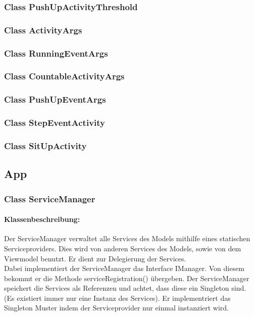 \documentclass[a4paper,12pt]{article}
\begin{document}
	\subsubsection{Class PushUpActivityThreshold}
	
	\subsubsection{Class ActivityArgs}
	\subsubsection{Class RunningEventArgs}
	
	\subsubsection{Class CountableActivityArgs}
	\subsubsection{Class PushUpEventArgs}
	\subsubsection{Class StepEventActivity}
	\subsubsection{Class SitUpActivity}
	

\subsection{App}
\subsubsection{Class ServiceManager}
	\paragraph{Klassenbeschreibung:}
	Der ServiceManager verwaltet alle Services des Models mithilfe eines statischen Serviceproviders. Dies wird von anderen Services des Models, sowie von dem Viewmodel benutzt. Er dient zur Delegierung der Services.\\ 
	Dabei implementiert der ServiceManager das Interface IManager.
	Von diesem bekommt er die Methode serviceRegistration() übergeben.
	Der ServiceManager speichert die Services als Referenzen und achtet, dass diese ein Singleton sind. (Es existiert immer nur eine Instanz des Services).
	Er implementriert das Singleton Muster indem der Serviceprovider nur einmal instanziert wird.
	
\end{document}
